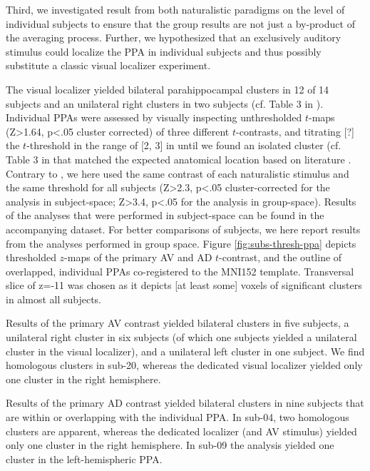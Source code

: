 \documentclass[english]{article}
\begin{document}
Third, we investigated result from both naturalistic paradigms on the level of
individual subjects to ensure that the group results are not just a by-product
of the averaging process.
Further, we hypothesized that an exclusively auditory stimulus could localize
the PPA in individual subjects and thus possibly substitute a classic visual
localizer experiment.

The visual localizer \citep{sengupta2016extension} yielded bilateral
parahippocampal clusters in 12 of 14 subjects and an unilateral right clusters
in two subjects (cf. Table 3 in \citep{sengupta2016extension}).
Individual PPAs were assessed by visually inspecting unthresholded $t$-maps
(Z>1.64, p<.05 cluster corrected) of three different $t$-contrasts, and titrating [?] the $t$-threshold in the range
of [2, 3] in until we found an isolated cluster (cf. Table 3 in  that matched the expected
anatomical location based on literature \citep{epstein1998ppa}.
Contrary to \citep{sengupta2016extension}, we here used the same contrast of
each naturalistic stimulus and the same threshold for all subjects (Z>2.3, p<.05
cluster-corrected for the analysis in subject-space; Z>3.4, p<.05 for the
analysis in group-space).
Results of the analyses that were performed in subject-space can be found in the
accompanying dataset.
For better comparisons of subjects, we here report results from the analyses
performed in group space.
Figure \ref{fig:subs-thresh-ppa} depicts thresholded $z$-maps of the primary AV
and AD $t$-contrast, and the outline of overlapped, individual PPAs
\citep{sengupta2016extension} co-registered to the MNI152 template.
Transversal slice of z=-11 was chosen as it depicts [at least some] voxels of
significant clusters in almost all subjects.

Results of the primary AV contrast yielded bilateral clusters in five subjects,
a unilateral right cluster in six subjects (of which one subjects yielded a
unilateral cluster in the visual localizer), and a unilateral left cluster in
one subject.
We find homologous clusters in sub-20, whereas the dedicated visual localizer
yielded only one cluster in the right hemisphere.

Results of the primary AD contrast yielded bilateral clusters in nine subjects
that are within or overlapping with the individual PPA.
In sub-04, two homologous clusters are apparent, whereas the dedicated localizer
(and AV stimulus) yielded only one cluster in the right hemisphere.
In sub-09 the analysis yielded one cluster in the left-hemispheric PPA.
\end{document}
